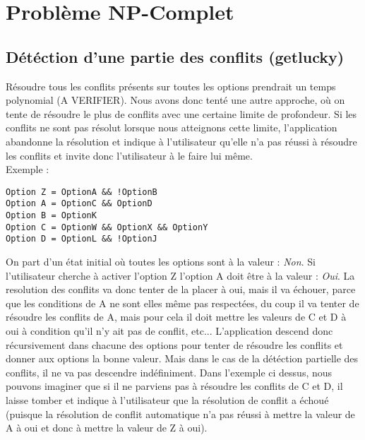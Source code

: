 \documentclass[16pts]{report}
\begin{document}

\nocite{*}

\chapter{Problème NP-Complet}
\label{cha:Problème NP-Complet}

\section{Détéction d'une partie des conflits (getlucky)}
\label{sec:Détéction d'une partie des conflits (getlucky)}

Résoudre tous les conflits présents sur toutes les options prendrait un temps
polynomial (A VERIFIER). Nous avons donc tenté une autre approche, où on tente
de résoudre le plus de conflits avec une certaine limite de profondeur. Si les
conflits ne sont pas résolut lorsque nous atteignons cette limite,
l'application abandonne la résolution et indique à l'utilisateur qu'elle n'a
pas réussi à résoudre les conflits et invite donc l'utilisateur à le faire lui
même.\\

Exemple :\\
\begin{lstlisting}
Option Z = OptionA && !OptionB
Option A = OptionC && OptionD
Option B = OptionK
Option C = OptionW && OptionX && OptionY
Option D = OptionL && !OptionJ
\end{lstlisting}

On part d'un état initial où toutes les options sont à la valeur :
\textit{Non}.  Si l'utilisateur cherche à activer l'option Z l'option A doit
être à la valeur : \textit{Oui}. La resolution des conflits va donc tenter de
la placer à oui, mais il va échouer, parce que les conditions de A ne sont elles
même pas respectées, du coup il va tenter de résoudre les conflits de A, mais
pour cela il doit mettre les valeurs de C et D à oui à condition qu'il n'y ait
pas de conflit, etc...  L'application descend donc récursivement dans chacune
des options pour tenter de résoudre les conflits et donner aux options la bonne
valeur. Mais dans le cas de la détéction partielle des conflits, il ne va pas
descendre indéfiniment. Dans l'exemple ci dessus, nous pouvons imaginer que si
il ne parviens pas à résoudre les conflits de C et D, il laisse tomber et
indique à l'utilisateur que la résolution de conflit a échoué (puisque la
résolution de conflit automatique n'a pas réussi à mettre la valeur de A à oui
et donc à mettre la valeur de Z à oui).\\
\end{document}
